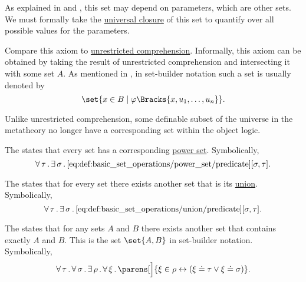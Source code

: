 \begin{definition}
\begin{thmenum}
    As explained in  and , this set may depend on parameters, which are other sets. We must formally take the \hyperref[thm:implicit_universal_quantification]{universal closure} of this set to quantify over all possible values for the parameters.

    Compare this axiom to \hyperref[def:naive_set_theory/unrestricted_comprehension]{unrestricted comprehension}. Informally, this axiom can be obtained by taking the result of unrestricted comprehension and intersecting it with some set \( A \). As mentioned in , in set-builder notation such a set is usually denoted by
    \begin{equation*}
      \set{ x \in B \given \varphi\Bracks{x, u_1, \ldots, u_n} }.
    \end{equation*}

    Unlike unrestricted comprehension, some definable subset of the universe in the metatheory no longer have a corresponding set within the object logic.

     The  states that every set has a corresponding \hyperref[def:basic_set_operations/power_set]{power set}. Symbolically,
    \begin{equation}\label{eq:def:zfc/power_set}
      \forall \thinspace \tau \thinspace . \thinspace \exists \thinspace \sigma \thinspace . \thinspace \ref{eq:def:basic_set_operations/power_set/predicate}[\sigma, \tau].
    \end{equation}

     The  states that for every set there exists another set that is its \hyperref[def:basic_set_operations/union]{union}. Symbolically,
    \begin{equation}\label{eq:def:zfc/union}
      \forall \thinspace \tau \thinspace . \thinspace \exists \thinspace \sigma \thinspace . \thinspace \ref{eq:def:basic_set_operations/union/predicate}[\sigma, \tau].
    \end{equation}

     The  states that for any sets \( A \) and \( B \) there exists another set that contains exactly \( A \) and \( B \). This is the set \( \set{ A, B } \) in set-builder notation. Symbolically,
    \begin{equation}\label{eq:def:zfc/pairing}
      \qforall \tau \qforall \sigma \qexists \rho \qforall \xi \parens[\Big]{ \xi \in \rho \leftrightarrow ( \xi \doteq \tau \vee \xi \doteq \sigma) }.
    \end{equation}


\end{thmenum}
\end{definition}
